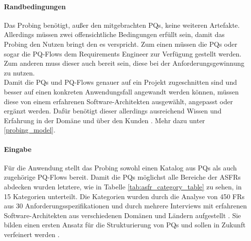 \paragraph{Randbedingungen}

Das Probing ben\"otigt, au\ss{}er den mitgebrachten PQs, keine weiteren Artefakte. Allerdings m\"ussen zwei offensichtliche Bedingungen erf\"ullt sein, damit das Probing den Nutzen bringt den es verspricht. Zum einen m\"ussen die PQs oder sogar die PQ-Flows dem Requirements Engineer zur Verf\"ugung gestellt werden. Zum anderen muss dieser auch bereit sein, diese bei der Anforderungsgewinnung zu nutzen. \\

Damit die PQs und PQ-Flows genauer auf ein Projekt zugeschnitten sind und besser auf einen konkreten Anwendungsfall angewandt werden k\"onnen, m\"ussen diese von einem erfahrenen Software-Architekten ausgew\"ahlt, angepasst oder erg\"anzt werden. Daf\"ur ben\"otigt dieser allerdings ausreichend Wissen und Erfahrung in der Dom\"ane und \"uber den Kunden \cite{Ros02}. Mehr dazu unter \ref{probing_model}. \\

\paragraph{Eingabe}

F\"ur die Anwendung stellt das Probing sowohl einen Katalog aus PQs als auch zugeh\"orige PQ-Flows bereit. Damit die PQs m\"oglichst alle Bereiche der ASFRs abdecken wurden letztere, wie in Tabelle \ref{tab:asfr_category_table} zu sehen, in 15 Kategorien unterteilt. Die Kategorien wurden durch die Analyse von 450 FRs aus 30 Anforderungsspezifikationen und durch mehrere Interviews mit erfahrenen Software-Architekten aus verschiedenen Dom\"anen und L\"andern aufgestellt  \cite{Ros02} \cite{Ros03}. Sie bilden einen ersten Ansatz f\"ur die Strukturierung von PQs und sollen in Zukunft verfeinert werden \cite{Ros03}. \\ 

